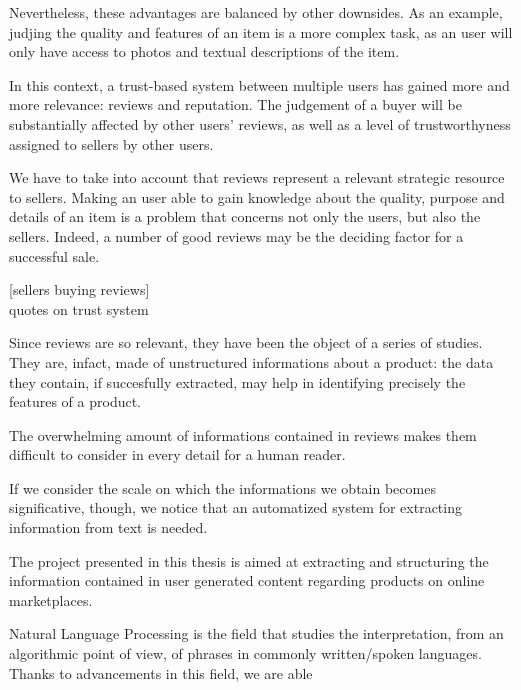 \documentclass[LaM,binding=0.6cm]{sapthesis}
\begin{document}
 Nevertheless, these advantages are balanced by other downsides. As an example, judjing the quality and features of an item is a more complex task, as an user will only have access to photos and textual descriptions of the item.

 In this context, a trust-based system between multiple users has gained more and more relevance: reviews and reputation. The judgement of a buyer will be substantially affected by other users' reviews, as well as a level of trustworthyness assigned to sellers by other users.

 We have to take into account that reviews represent a relevant strategic resource to sellers.
 Making an user able to gain knowledge about the quality, purpose and details of an item is a problem that concerns not only the users, but also the sellers. Indeed, a number of good reviews may be the deciding factor for a successful sale. 

 [sellers buying reviews] \\
 quotes on trust system

 \bigskip

 Since reviews are so relevant, they have been the object of a series of studies. They are, infact, made of unstructured informations about a product: the data they contain, if succesfully extracted, may help in identifying precisely the features of a product. 

 The overwhelming amount of informations contained in reviews makes them difficult to consider in every detail for a human reader. 

 If we consider the scale on which the informations we obtain becomes significative, though, we notice that an automatized system for extracting information from text is needed. 

 The project presented in this thesis is aimed at extracting and structuring the information contained in user generated content regarding products on online marketplaces. 

 Natural Language Processing is the field that studies the interpretation, from an algorithmic point of view, of phrases in commonly written/spoken languages. Thanks to advancements in this field, we are able 




\end{document}
